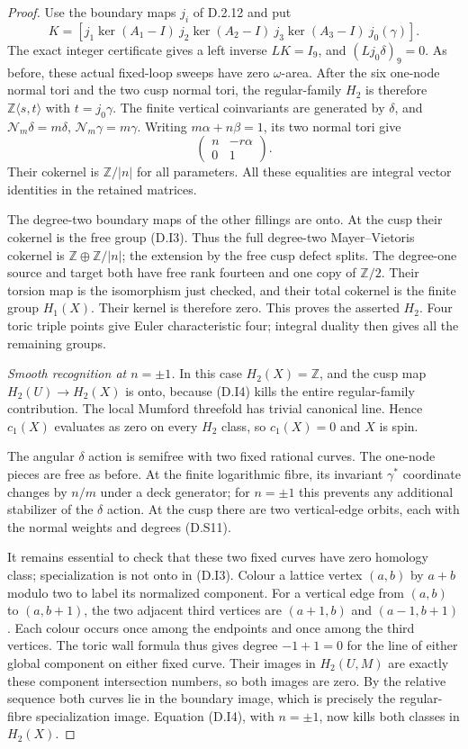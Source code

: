 \begin{proof}
Use the boundary maps $j_i$ of D.2.12 and put
\[
 K=[j_1\ker(A_1-I)\ j_2\ker(A_2-I)
       \ j_3\ker(A_3-I)\ j_0(\gamma)].
\]
The exact integer certificate gives a left inverse
$LK=I_9$, and $(Lj_0\delta)_9=0$.
As before, these actual fixed-loop sweeps have zero
$\omega$-area. After the six one-node normal tori and
the two cusp normal tori, the regular-family $H_2$ is
therefore $\mathbb Z\langle s,t\rangle$ with
$t=j_0\gamma$.
The finite vertical coinvariants are generated by
$\delta$, and
$\mathcal N_m\delta=m\delta$,
$\mathcal N_m\gamma=m\gamma$.
Writing $m\alpha+n\beta=1$, its two normal tori give
\[
                        \begin{pmatrix}n&-r\alpha\\0&1\end{pmatrix}.
 \tag{D.I4}
\]
Their cokernel is $\mathbb Z/|n|$ for all parameters.
All these equalities are integral vector identities in
the retained matrices.

The degree-two boundary maps of the other fillings are
onto. At the cusp their cokernel is the free group
(D.I3). Thus the full degree-two Mayer--Vietoris cokernel
is $\mathbb Z\oplus\mathbb Z/|n|$; the extension by
the free cusp defect splits. The degree-one source and
target both have free rank fourteen and one copy of
$\mathbb Z/2$. Their torsion map is the isomorphism
just checked, and their total cokernel is the finite
group $H_1(X)$. Their kernel is therefore zero.
This proves the asserted $H_2$. Four toric triple points
give Euler characteristic four; integral duality then
gives all the remaining groups.

\emph{Smooth recognition at $n=\pm1$.}
In this case $H_2(X)=\mathbb Z$, and the cusp map
$H_2(U)\to H_2(X)$ is onto, because (D.I4) kills the
entire regular-family contribution. The local Mumford
threefold has trivial canonical line. Hence $c_1(X)$
evaluates as zero on every $H_2$ class, so $c_1(X)=0$
and $X$ is spin.

The angular $\delta$ action is semifree with two fixed
rational curves. The one-node pieces are free as before.
At the finite logarithmic fibre, its invariant
$\gamma^*$ coordinate changes by $n/m$ under a deck
generator; for $n=\pm1$ this prevents any additional
stabilizer of the $\delta$ action. At the cusp there
are two vertical-edge orbits, each with the normal
weights and degrees (D.S11).

It remains essential to check that these two fixed curves
have zero homology class; specialization is not onto in
(D.I3). Colour a lattice vertex $(a,b)$ by $a+b$ modulo
two to label its normalized component. For a vertical
edge from $(a,b)$ to $(a,b+1)$, the two adjacent third
vertices are $(a+1,b)$ and $(a-1,b+1)$.
Each colour occurs once among the endpoints and once
among the third vertices. The toric wall formula thus
gives degree $-1+1=0$ for the line of either global
component on either fixed curve. Their images in
$H_2(U,M)$ are exactly these component intersection
numbers, so both images are zero. By the relative
sequence both curves lie in the boundary image, which
is precisely the regular-fibre specialization image.
Equation (D.I4), with $n=\pm1$, now kills both classes
in $H_2(X)$.


\end{proof}
